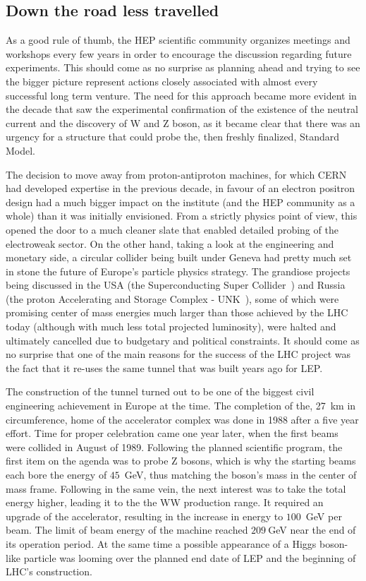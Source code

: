\subsection{Down the road less travelled}
\hspace{10pt} As a good rule of thumb, the HEP scientific community organizes meetings and workshops every few years in order to encourage the discussion regarding future experiments. This should come as no surprise as planning ahead and trying to see the bigger picture represent actions closely associated with almost every successful long term venture. The need for this approach became more evident in the decade that saw the experimental confirmation of the existence of the neutral current and the discovery of W and Z boson, as it became clear that there was an urgency for a structure that could probe the, then freshly finalized, Standard Model.

\hspace{10pt} The decision to move away from proton-antiproton machines, for which CERN had developed expertise in the previous decade, in favour of an electron positron design had a much bigger impact on the institute (and the HEP community as a whole) than it was initially envisioned. From a strictly physics point of view, this opened the door to a much cleaner slate that enabled detailed probing of the electroweak sector. On the other hand, taking a look at the engineering and monetary side, a circular collider being built under Geneva had pretty much set in stone the future of Europe's particle physics strategy. The grandiose projects being discussed in the USA (the Superconducting Super Collider~\cite{SSC_proposal}) and Russia (the proton Accelerating and Storage Complex - UNK~\cite{UNK_proposal}), some of which were promising center of mass energies much larger than those achieved by the LHC today (although with much less total projected luminosity), were halted and ultimately cancelled due to budgetary and political constraints. It should come as no surprise that one of the main reasons for the success of the LHC project was the fact that it re-uses the same tunnel that was built years ago for LEP.

\hspace{10pt} The construction of the tunnel turned out to be one of the biggest civil engineering achievement in Europe at the time. The completion of the, 27~km in circumference, home of the accelerator complex was done in 1988 after a five year effort. Time for proper celebration came one year later, when the first beams were collided in August of 1989. Following the planned scientific program, the first item on the agenda was to probe Z bosons, which is why the starting beams each bore the energy of $45$~GeV, thus matching the boson's mass in the center of mass frame. Following in the same vein, the next interest was to take the total energy higher, leading it to the the WW production range. It required an upgrade of the accelerator, resulting in the increase in energy to $100$~GeV per beam. The limit of beam energy of the machine reached $209~$GeV near the end of its operation period. At the same time a possible appearance of a Higgs boson-like particle was looming over the planned end date of LEP and the beginning of LHC's construction.

